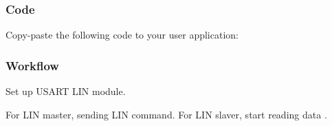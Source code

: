 \hypertarget{asfdoc_sam0_sercom_usart_lin_use_case_asfdoc_sam0_usart_lin_use_case_main_code}{}\subsubsection{Code}\label{asfdoc_sam0_sercom_usart_lin_use_case_asfdoc_sam0_usart_lin_use_case_main_code}
Copy-\/paste the following code to your user application\+: 
\begin{DoxyCodeInclude}{0}
\end{DoxyCodeInclude}
 \hypertarget{asfdoc_sam0_sercom_usart_lin_use_case_asfdoc_sam0_usart_lin_use_case_main_flow}{}\subsubsection{Workflow}\label{asfdoc_sam0_sercom_usart_lin_use_case_asfdoc_sam0_usart_lin_use_case_main_flow}

\begin{DoxyEnumerate}
\item Set up U\+S\+A\+RT L\+IN module. 
\begin{DoxyCodeInclude}{0}
\end{DoxyCodeInclude}

\item For L\+IN master, sending L\+IN command. For L\+IN slaver, start reading data . 
\begin{DoxyCodeInclude}{0}
\end{DoxyCodeInclude}

\end{DoxyEnumerate}